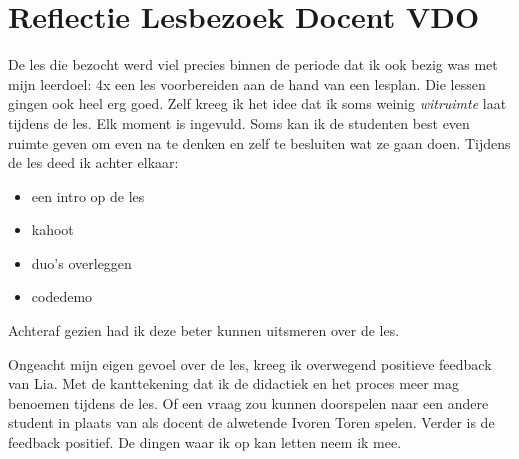 
\section{Reflectie Lesbezoek Docent VDO}
\label{sec:lesbezoek}
De les die bezocht werd viel precies binnen de periode dat ik ook bezig was met mijn leerdoel: 4x een les voorbereiden aan de hand van een lesplan. Die lessen gingen ook heel erg goed. Zelf kreeg ik het idee dat ik soms weinig \textit{witruimte} laat tijdens de les. Elk moment is ingevuld. Soms kan ik de studenten best even ruimte geven om even na te denken en zelf te besluiten wat ze gaan doen. Tijdens de les deed ik achter elkaar:
\begin{itemize}
  \item een intro op de les
  \item kahoot
  \item duo's overleggen
  \item codedemo

\end{itemize}
Achteraf gezien had ik deze beter kunnen uitsmeren over de les.

Ongeacht mijn eigen gevoel over de les, kreeg ik overwegend positieve feedback van Lia. Met de kanttekening dat ik de didactiek en het proces meer mag benoemen tijdens de les. Of een vraag zou kunnen doorspelen naar een andere student in plaats van als docent de alwetende Ivoren Toren spelen. 
Verder is de feedback positief. De dingen waar ik op kan letten neem ik mee.

